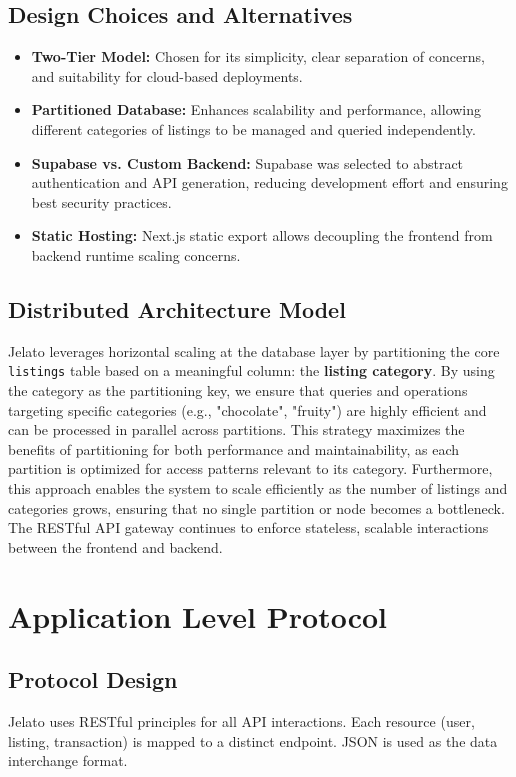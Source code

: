 \documentclass[12pt,a4paper]{report}
\begin{document}
\section{Design Choices and Alternatives}
\begin{itemize}
    \item \textbf{Two-Tier Model:} Chosen for its simplicity, clear separation of concerns, and suitability for cloud-based deployments.
    \item \textbf{Partitioned Database:} Enhances scalability and performance, allowing different categories of listings to be managed and queried independently.
    \item \textbf{Supabase vs. Custom Backend:} Supabase was selected to abstract authentication and API generation, reducing development effort and ensuring best security practices.
    \item \textbf{Static Hosting:} Next.js static export allows decoupling the frontend from backend runtime scaling concerns.
\end{itemize}

\section{Distributed Architecture Model}
Jelato leverages horizontal scaling at the database layer by partitioning the core \texttt{listings} table based on a meaningful column: the \textbf{listing category}. By using the category as the partitioning key, we ensure that queries and operations targeting specific categories (e.g., "chocolate", "fruity") are highly efficient and can be processed in parallel across partitions. This strategy maximizes the benefits of partitioning for both performance and maintainability, as each partition is optimized for access patterns relevant to its category. Furthermore, this approach enables the system to scale efficiently as the number of listings and categories grows, ensuring that no single partition or node becomes a bottleneck. The RESTful API gateway continues to enforce stateless, scalable interactions between the frontend and backend.

\chapter{Application Level Protocol}
\section{Protocol Design}
Jelato uses RESTful principles for all API interactions. Each resource (user, listing, transaction) is mapped to a distinct endpoint. JSON is used as the data interchange format.
\end{document}
